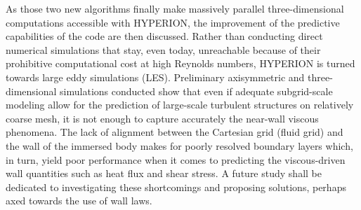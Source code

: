 As those two new algorithms finally make massively parallel three-dimensional computations accessible with HYPERION, the improvement of the predictive capabilities of the code are then discussed.
Rather than conducting direct numerical simulations that stay, even today, unreachable because of their prohibitive computational cost at high Reynolds numbers, HYPERION is turned towards large eddy simulations (LES).
Preliminary axisymmetric and three-dimensional simulations conducted show that even if adequate subgrid-scale modeling allow for the prediction of large-scale turbulent structures on relatively coarse mesh, it is not enough to capture accurately the near-wall viscous phenomena.
The lack of alignment between the Cartesian grid (fluid grid) and the wall of the immersed body makes for poorly resolved boundary layers which, in turn, yield poor performance when it comes to predicting the viscous-driven wall quantities such as heat flux and shear stress.
A future study shall be dedicated to investigating these shortcomings and proposing solutions, perhaps axed towards the use of wall laws.
